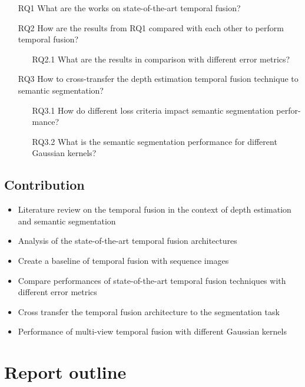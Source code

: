      \begin{itemize}
    	\setlength\itemsep{0.01em}
    	\item[RQ1] What are the works on state-of-the-art temporal fusion?
    	\item[RQ2] How are the results from RQ1 compared with each other to perform temporal
    	fusion?
    	\begin{itemize}
    	\item[RQ2.1] What are the results in comparison with different error metrics?
    	\end{itemize}
    	\item[RQ3] How to cross-transfer the depth estimation temporal fusion technique to semantic segmentation?
    	\begin{itemize}
    	\item [RQ3.1] How do different loss criteria impact semantic segmentation perfor-
    	mance?
    	\item[RQ3.2] What is the semantic segmentation performance for different Gaussian
    	kernels?
    	\end{itemize}
    \end{itemize}
    
    \subsection{Contribution}
    
    \begin{itemize}
    	\item Literature review on the temporal fusion in the context of depth estimation
    	and semantic segmentation
    	\item Analysis of the state-of-the-art temporal fusion architectures
    	\item Create a baseline of temporal fusion with sequence images
    	\item  Compare performances of state-of-the-art temporal fusion techniques with
    	different error metrics
    	\item Cross transfer the temporal fusion architecture to the segmentation task
    	\item Performance of multi-view temporal fusion with different Gaussian kernels
    \end{itemize}
    \section{Report outline}
    
